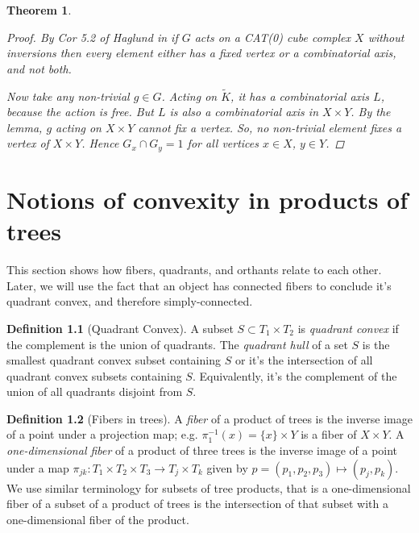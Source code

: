 \documentclass[12pt,parskip=full]{report}
\theoremstyle{plain}
\newtheorem{thm}{Theorem}[section]
\theoremstyle{definition}
\newtheorem{dfn}[thm]{Definition}
\begin{document}
\begin{thm}
\begin{proof}
By Cor 5.2 of Haglund in \cite{haglundss} if \(G\) acts on a CAT(0) cube complex \(X\)
without inversions then every element either has a fixed vertex or a
combinatorial axis, and not both.

Now take any non-trivial \(g \in G\). Acting on \(\widetilde K\), it has a combinatorial
axis \(L\), because the action is free. But \(L\) is also a combinatorial axis
in \(X\times Y\). By the lemma, \(g\) acting on \(X\times Y\) cannot fix a vertex.
So, no non-trivial element fixes a vertex of \(X\times Y\). Hence \(G_x \cap G_y =
1\) for all vertices \(x \in X\), \(y \in Y\).
    
\end{proof}
\end{thm}


\chapter{Notions of convexity in products of trees}

This section shows how fibers, quadrants, and orthants relate to each other. Later, we will use the fact that an object has connected fibers to conclude it's quadrant convex, and therefore simply-connected.

\begin{dfn}
    [Quadrant Convex]
    A subset \(S \subset T_1\times T_2\) is \emph{quadrant convex} if the complement is the union of quadrants. The \emph{quadrant hull} of a set \(S\) is the smallest quadrant convex subset containing \(S\) or it's the intersection of all quadrant convex subsets containing \(S\). Equivalently, it's the complement of the union of all quadrants disjoint from \(S\). 
\end{dfn}

\begin{dfn}
    [Fibers in trees]
    \label{dfn:treefibers}
    A \emph{fiber} of a product of trees is the inverse image of a point under a projection map; e.g. \( \pi_1^{-1}(x) = \{x\} \times Y\) is a fiber of \(X\times Y\). A \emph{one-dimensional fiber} of a product of three trees is the inverse image of a point under a map \(\pi_{jk}: T_1\times T_2\times T_3 \to T_j\times T_k\) given by \(p = (p_1,p_2,p_3) \mapsto (p_j, p_k)\). We use similar terminology for subsets of tree products, that is a one-dimensional fiber of a subset of a product of trees is the intersection of that subset with a one-dimensional fiber of the product.
\end{dfn}
\end{document}
